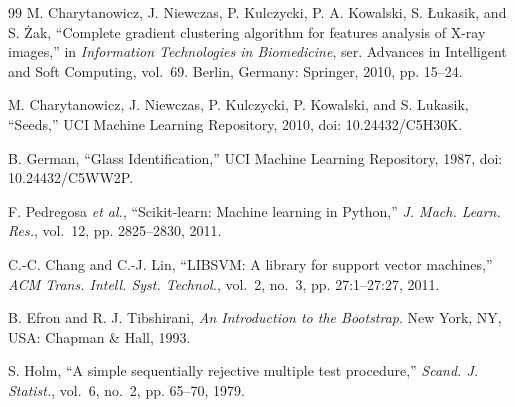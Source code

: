 \begin{thebibliography}{99}
M. Charytanowicz, J. Niewczas, P. Kulczycki, P. A. Kowalski, S. {\L}ukasik, and S. {\.Z}ak, ``Complete gradient clustering algorithm for features analysis of X-ray images,'' in \emph{Information Technologies in Biomedicine}, ser. Advances in Intelligent and Soft Computing, vol.~69. Berlin, Germany: Springer, 2010, pp. 15--24.

M. Charytanowicz, J. Niewczas, P. Kulczycki, P. Kowalski, and S. Lukasik, ``Seeds,'' UCI Machine Learning Repository, 2010, doi: 10.24432/C5H30K.

B. German, ``Glass Identification,'' UCI Machine Learning Repository, 1987, doi: 10.24432/C5WW2P.

F. Pedregosa \emph{et al.}, ``Scikit-learn: Machine learning in Python,'' \emph{J. Mach. Learn. Res.}, vol.~12, pp. 2825--2830, 2011.

C.-C. Chang and C.-J. Lin, ``LIBSVM: A library for support vector machines,'' \emph{ACM Trans. Intell. Syst. Technol.}, vol.~2, no.~3, pp. 27:1--27:27, 2011.

B. Efron and R. J. Tibshirani, \emph{An Introduction to the Bootstrap}. New York, NY, USA: Chapman \& Hall, 1993.

S. Holm, ``A simple sequentially rejective multiple test procedure,'' \emph{Scand. J. Statist.}, vol.~6, no.~2, pp. 65--70, 1979.

\end{thebibliography}
